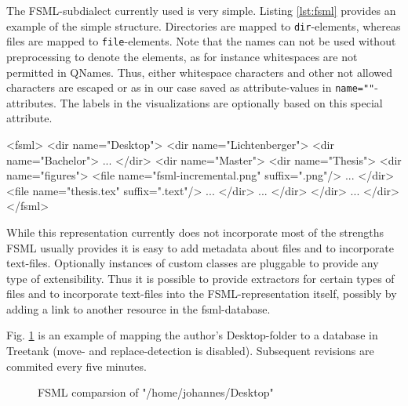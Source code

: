 The FSML-subdialect currently used is very simple. Listing \ref{lst:fsml} provides an example of the simple structure. Directories are mapped to \texttt{dir}-elements, whereas files are mapped to \texttt{file}-elements. Note that the names can not be used without preprocessing to denote the elements, as for instance whitespaces are not permitted in QNames. Thus, either whitespace characters and other not allowed characters are escaped or as in our case saved as attribute-values in \texttt{name=""}-attributes. The labels in the visualizations are optionally based on this special attribute.

\begin{code}[caption=FSML structure]
<fsml>
  <dir name="Desktop">
    <dir name="Lichtenberger">
      <dir name="Bachelor">
        ...
      </dir>
      <dir name="Master">
        <dir name="Thesis">
          <dir name="figures">
            <file name="fsml-incremental.png" suffix=".png"/>
            ...
          </dir>
          <file name="thesis.tex" suffix=".text"/>
          ...
        </dir>
        ...
      </dir>
    </dir>
    ...
  </dir>
</fsml>
\end{code}
\label{lst:fsml}

While this representation currently does not incorporate most of the strengths FSML usually provides it is easy to add metadata about files and to incorporate text-files. Optionally instances of custom classes are pluggable to provide any type of extensibility. Thus it is possible to provide extractors for certain types of files and to incorporate text-files into the FSML-representation itself, possibly by adding a link to another resource in the fsml-database.

Fig. \ref{fig:fsml-itemsize-pruning} is an example of mapping the author's Desktop-folder to a database in Treetank (move- and replace-detection is disabled). Subsequent revisions are commited every five minutes.

\begin{figure}[tb]
\caption{\label{fig:fsml-itemsize-pruning} FSML comparsion of "/home/johannes/Desktop"}
\end{figure}

